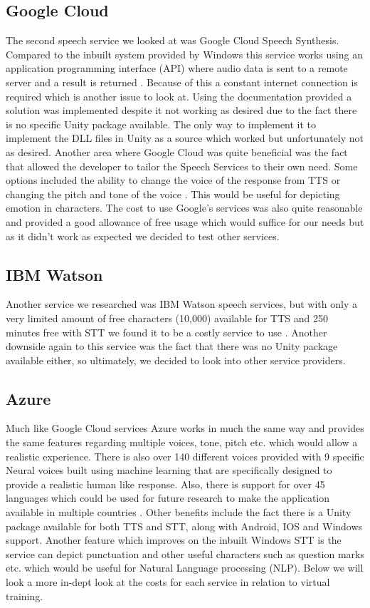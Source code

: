 \subsection{Google Cloud}
The second speech service we looked at was Google Cloud Speech Synthesis. Compared to the inbuilt system provided by Windows this service works using an application programming interface (API) where audio data is sent to a remote server and a result is returned \cite{googlespeech}. Because of this a constant internet connection is required which is another issue to look at. Using the documentation provided a solution was implemented despite it not working as desired due to the fact there is no specific Unity package available. The only way to implement it to implement the DLL files in Unity as a source which worked but unfortunately not as desired. Another area where Google Cloud was quite beneficial was the fact that allowed the developer to tailor the Speech Services to their own need. Some options included the ability to change the voice of the response from TTS or changing the pitch and tone of the voice \cite{googlespeech}. This would be useful for depicting emotion in characters. The cost to use Google's services was also quite reasonable and provided a good allowance of free usage which would suffice for our needs but as it didn't work as expected we decided to test other services. 

\subsection{IBM Watson}
Another service we researched was IBM Watson speech services, but with only a very limited amount of free characters (10,000) available for TTS and 250 minutes free with STT we found it to be a costly service to use \cite{ibmspeech}. Another downside again to this service was the fact that there was no Unity package available either, so ultimately, we decided to look into other service providers.

\subsection{Azure}
Much like Google Cloud services Azure works in much the same way and provides the same features regarding multiple voices, tone, pitch etc. which would allow a realistic experience. There is also over 140 different voices provided with 9 specific Neural voices built using machine learning that are specifically designed to provide a realistic human like response. Also, there is support for over 45 languages which could be used for future research to make the application available in multiple countries \cite{azurespeech}. Other benefits include the fact there is a Unity package available for both TTS and STT, along with Android, IOS and Windows support. Another feature which improves on the inbuilt Windows STT is the service can depict punctuation and other useful characters such as question marks etc. which would be useful for Natural Language processing (NLP). Below we will look a more in-dept look at the costs for each service in relation to virtual training.

